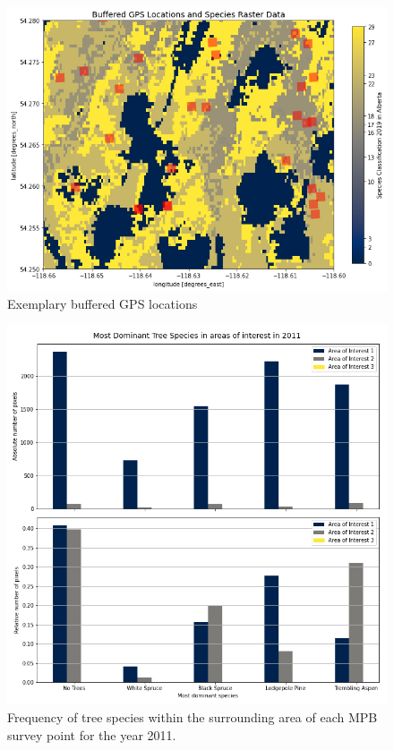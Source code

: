 \documentclass[
]{article}
\begin{document}
\begin{figure}

{\centering \includegraphics[width=0.8\linewidth]{../graphics/bufferedPointsExample} 

}

\caption{Exemplary buffered GPS locations}\label{fig:bufferedPointsExample}
\end{figure}
\begin{figure}

{\centering \includegraphics[width=0.8\linewidth]{../graphics/freq_species_11} 

}

\caption{Frequency of tree species within the surrounding area of each MPB survey point for the year 2011.}\label{fig:freqSpecies11}
\end{figure}
\end{document}
